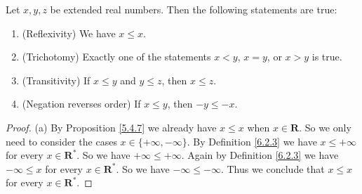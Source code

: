 \setcounter{theorem}{4}
\begin{proposition}\label{6.2.5}
    Let \(x, y, z\) be extended real numbers.
    Then the following statements are true:
    \begin{enumerate}
        \item (Reflexivity)
              We have \(x \leq x\).
        \item (Trichotomy)
              Exactly one of the statements \(x < y\), \(x = y\), or \(x > y\) is true.
        \item (Transitivity)
              If \(x \leq y\) and \(y \leq z\), then \(x \leq z\).
        \item (Negation reverses order) If \(x \leq y\), then \(-y \leq -x\).
    \end{enumerate}
\end{proposition}

\begin{proof}{(a)}
    By Proposition \ref{5.4.7} we already have \(x \leq x\) when \(x \in \mathbf{R}\).
    So we only need to consider the cases \(x \in \{+\infty, -\infty\}\).
    By Definition \ref{6.2.3} we have \(x \leq +\infty\) for every \(x \in \mathbf{R}^*\).
    So we have \(+\infty \leq +\infty\).
    Again by Definition \ref{6.2.3} we have \(-\infty \leq x\) for every \(x \in \mathbf{R}^*\).
    So we have \(-\infty \leq -\infty\).
    Thus we conclude that \(x \leq x\) for every \(x \in \mathbf{R}^*\).
\end{proof}


